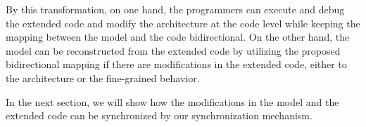 



By this transformation, on one hand, the programmers can execute and debug the extended code and modify the architecture at the code level while keeping the mapping between the model and the code bidirectional.
On the other hand, the model can be reconstructed from the extended code by utilizing the proposed bidirectional mapping if there are modifications in the extended code, either to the architecture or the fine-grained behavior.

In the next section, we will show how the modifications in the model and the extended code can be synchronized by our synchronization mechanism.




